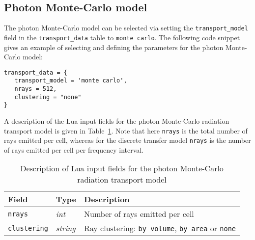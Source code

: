 \subsection{Photon Monte-Carlo model}

The photon Monte-Carlo model can be selected via setting the \texttt{transport\_model} field in the \texttt{transport\_data} table to \texttt{monte carlo}.
The following code snippet gives an example of selecting and defining the parameters for the photon Monte-Carlo model:

\noindent \topbar
\begin{lstlisting}[basicstyle=\ttfamily\normalsize]
transport_data = {
   transport_model = 'monte carlo',
   nrays = 512,
   clustering = "none"
}
\end{lstlisting}
\bottombar

A description of the Lua input fields for the photon Monte-Carlo radiation transport model is given in Table~\ref {tab:PMC-input}.
Note that here \texttt{nrays} is the total number of rays emitted per cell, whereas for the discrete transfer model \texttt{nrays} is the number of rays emitted per cell per frequency interval.

\begin{table}[h]
 \begin{center}
  \caption{Description of Lua input fields for the photon Monte-Carlo radiation transport model}
  \label{tab:PMC-input}
\begin{tabular}{llp{8cm}}
 \hline \hline
 Field                        & Type              &  Description \\ \hline
\texttt{nrays}            & \textit{int}       &  Number of rays emitted per cell \\
\texttt{clustering}    & \textit{string}  &  Ray clustering: \texttt{by volume}, \texttt{by area} or \texttt{none} \\
\hline
\end{tabular}
\end{center}
\end{table}